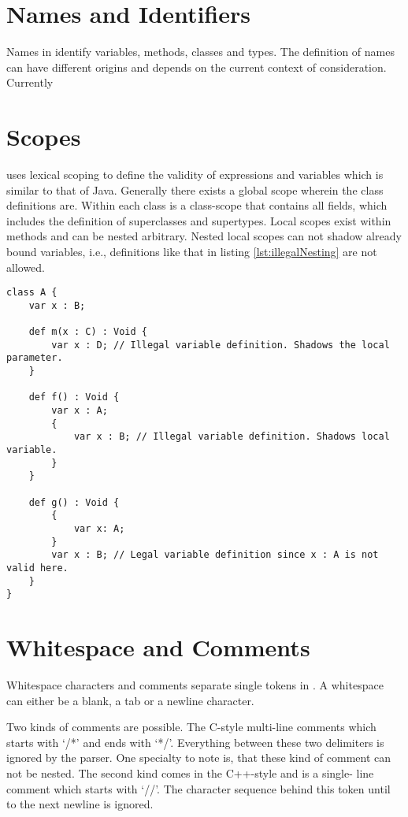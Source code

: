 \section{Names and Identifiers}
Names in \ooplss identify variables, methods, classes and types. The
definition of names can have different origins and depends on the current
context of consideration. Currently


\section{Scopes}
\ooplss uses lexical scoping to define the validity of expressions and 
variables which is similar to that of Java. Generally there exists a global
scope wherein the class definitions are. Within each class is a class-scope
that contains all fields, which includes the definition of superclasses and
supertypes. Local scopes exist within methods and can be nested arbitrary.
Nested local scopes can not shadow already bound variables, i.e., definitions
like that in listing \ref{lst:illegalNesting} are not allowed.

\begin{lstlisting}[float,language=ooplss,caption=Variable definition in local scope,label=lst:illegalNesting]
class A {
	var x : B;

	def m(x : C) : Void {
		var x : D; // Illegal variable definition. Shadows the local parameter.
	}

	def f() : Void {
		var x : A; 
		{
			var x : B; // Illegal variable definition. Shadows local variable.
		}
	}

	def g() : Void {
		{
			var x: A;
		}
		var x : B; // Legal variable definition since x : A is not valid here.
	}
}
\end{lstlisting}
\section{Whitespace and Comments}
Whitespace characters and comments separate single tokens in \ooplss. A
whitespace can either be a blank, a tab or a newline character.

Two kinds of comments are possible. The C-style multi-line comments which
starts with `/*' and ends with `*/'. Everything between these two delimiters
is ignored by the parser. One specialty to note is, that these kind of comment
can not be nested. The second kind comes in the C++-style and is a single-
line comment which starts with `//'. The character sequence behind this token
until to the next newline is ignored.

